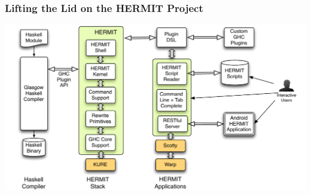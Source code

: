 \begin{frame}
\frametitle{Lifting the Lid on the HERMIT Project}

\includegraphics[width=\textwidth]{Pictures/HermitArch}

\end{frame}
